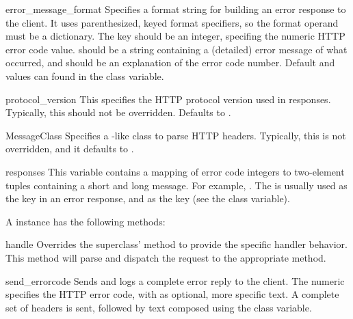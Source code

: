 \begin{memberdesc}{error_message_format}
Specifies a format string for building an error response to the
client. It uses parenthesized, keyed format specifiers, so the
format operand must be a dictionary. The  key should
be an integer, specifing the numeric HTTP error code value.
 should be a string containing a (detailed) error
message of what occurred, and  should be an
explanation of the error code number. Default 
and  values can found in the 
class variable.
\end{memberdesc}

\begin{memberdesc}{protocol_version}
This specifies the HTTP protocol version used in responses.
Typically, this should not be overridden. Defaults to
.
\end{memberdesc}

\begin{memberdesc}{MessageClass}
Specifies a -like class to parse HTTP
headers. Typically, this is not overridden, and it defaults to
.
\end{memberdesc}

\begin{memberdesc}{responses}
This variable contains a mapping of error code integers to two-element
tuples containing a short and long message. For example,
. The
 is usually used as the  key in an
error response, and  as the  key
(see the  class variable).
\end{memberdesc}


A  instance has the following methods:

\begin{methoddesc}{handle}{}
Overrides the superclass'  method to provide the
specific handler behavior. This method will parse and dispatch
the request to the appropriate  method.
\end{methoddesc}

\begin{methoddesc}{send_error}{code}
Sends and logs a complete error reply to the client. The numeric
 specifies the HTTP error code, with  as
optional, more specific text. A complete set of headers is sent,
followed by text composed using the 
class variable.
\end{methoddesc}

